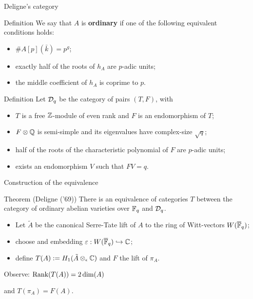 \documentclass{beamer}
\begin{document}
\begin{frame}{Deligne's category}
  \begin{block}{Definition}
    We say that $A$ is \textbf{ordinary} if one of the following equivalent
    conditions holds:
\pause
    \begin{itemize}
      \item $\#A[p](\bar k) = p^g$;
      \item exactly half of the roots of $h_A$ are $p$-adic units;
      \item the middle coefficient of $h_A$ is coprime to $p$.
    \end{itemize}
  \end{block}
\pause
  \begin{block}{Definition}
    Let ${\mathcal D}_q$ be the category of pairs $(T,F)$, with
    \begin{itemize}
      \item $T$ is a free $\mathbb{Z}$-module of even rank and $F$ is an endomorphism of $T$;
      \item $F\otimes \mathbb{Q}$ is semi-simple and its eigenvalues have complex-size $\sqrt{q}$;
      \item half of the roots of the characteristic polynomial of $F$ are $p$-adic units;
      \item exists an endomorphism $V$ such that $FV=q$.
    \end{itemize}
  \end{block}
\end{frame}

\begin{frame}{Construction of the equivalence}
  \begin{alertblock}{Theorem (Deligne ('69))}
    There is an equivalence of categories $T$ between the category of ordinary abelian varieties over $\mathbb{F}_q$ and ${\mathcal D}_q$.
  \end{alertblock}
  \begin{itemize}
    \pause \item Let $\tilde A$ be the canonical Serre-Tate lift of $A$ to the ring of Witt-vectors $W(\overline{\mathbb{F}}_q)$;
    \pause \item choose and embedding $\varepsilon: W(\overline{\mathbb{F}}_q)\hookrightarrow \mathbb{C}$;
    \pause \item define $T(A):=H_1(\tilde A \otimes_\epsilon \mathbb{C})$ and $F$ the lift of $\pi_A$.
  \end{itemize}
\pause
  Observe: $\operatorname{Rank} (T(A)) = 2\dim(A)$

  and $T(\pi_A)=F(A)$.
\pause
\end{frame}
\end{document}
